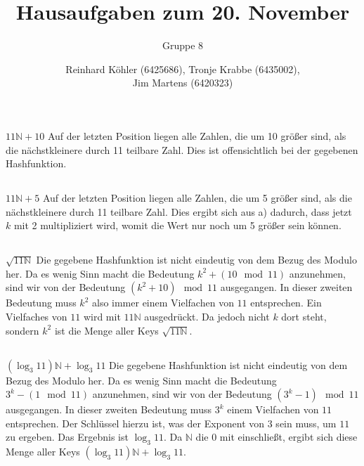 \documentclass[10pt,a4paper,oneside,ngerman,numbers=noenddot]{scrartcl}
\begin{document}
\author{Reinhard Köhler (6425686), Tronje Krabbe (6435002), \\
Jim Martens (6420323)}
\title{Hausaufgaben zum 20. November}
\subtitle{Gruppe 8}
\maketitle
\section{} %
	\subsection{} %
		$11\mathbb{N}+10$
		Auf der letzten Position liegen alle Zahlen, die um 10 größer sind, als die nächstkleinere durch 11 teilbare Zahl. Dies ist offensichtlich bei der gegebenen Hashfunktion. 
	\subsection{} %
		$11\mathbb{N}+5$
		Auf der letzten Position liegen alle Zahlen, die um 5 größer sind, als die nächstkleinere durch 11 teilbare Zahl. Dies ergibt sich aus a) dadurch, dass jetzt $k$ mit 2 multipliziert wird, womit die Wert nur noch um 5 größer sein können.
	\subsection{} %
		$\sqrt{11\mathbb{N}}$
		Die gegebene Hashfunktion ist nicht eindeutig von dem Bezug des Modulo her. Da es wenig Sinn macht die Bedeutung $k^{2} + (10 \mod 11)$ anzunehmen, sind wir von der Bedeutung $(k^{2} + 10) \mod 11$ ausgegangen. In dieser zweiten Bedeutung muss $k^{2}$ also immer einem Vielfachen von $11$ entsprechen. Ein Vielfaches von $11$ wird mit $11\mathbb{N}$ ausgedrückt. Da jedoch nicht $k$ dort steht, sondern $k^{2}$ ist die Menge aller Keys $\sqrt{11\mathbb{N}}$.
	\subsection{} %
		$(\log_{3}11)\mathbb{N} + \log_{3}11$
		Die gegebene Hashfunktion ist nicht eindeutig von dem Bezug des Modulo her. Da es wenig Sinn macht die Bedeutung $3^{k}- (1 \mod 11)$ anzunehmen, sind wir von der Bedeutung $(3^{k}-1) \mod 11$ ausgegangen. In dieser zweiten Bedeutung muss $3^{k}$ einem Vielfachen von $11$ entsprechen. Der Schlüssel hierzu ist, was der Exponent von $3$ sein muss, um $11$ zu ergeben. Das Ergebnis ist $\log_{3}11$. Da $\mathbb{N}$ die $0$ mit einschließt, ergibt sich diese Menge aller Keys $(\log_{3}11)\mathbb{N} + \log_{3}11$.
\end{document}

